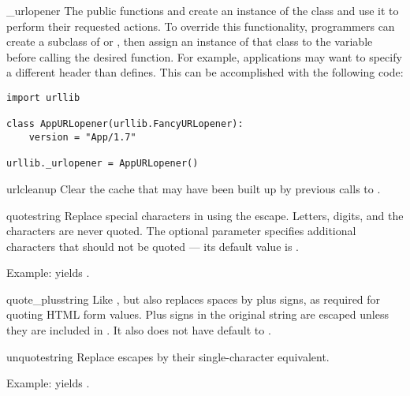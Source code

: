 \begin{datadesc}{_urlopener}
The public functions  and
 create an instance of the
 class and use it to perform their requested
actions.  To override this functionality, programmers can create a
subclass of  or , then assign
an instance of that class to the
 variable before calling the desired function.
For example, applications may want to specify a different
 header than  defines.  This
can be accomplished with the following code:

\begin{verbatim}
import urllib

class AppURLopener(urllib.FancyURLopener):
    version = "App/1.7"

urllib._urlopener = AppURLopener()
\end{verbatim}
\end{datadesc}

\begin{funcdesc}{urlcleanup}{}
Clear the cache that may have been built up by previous calls to
.
\end{funcdesc}

\begin{funcdesc}{quote}{string}
Replace special characters in  using the  escape.
Letters, digits, and the characters  are never quoted.
The optional  parameter specifies additional characters
that should not be quoted --- its default value is .

Example:  yields .
\end{funcdesc}

\begin{funcdesc}{quote_plus}{string}
Like , but also replaces spaces by plus signs, as
required for quoting HTML form values.  Plus signs in the original
string are escaped unless they are included in .  It also
does not have  default to .
\end{funcdesc}

\begin{funcdesc}{unquote}{string}
Replace  escapes by their single-character equivalent.

Example:  yields .
\end{funcdesc}

